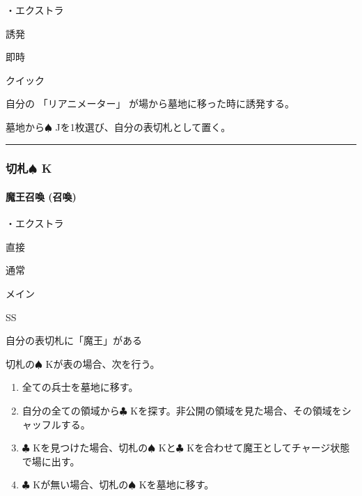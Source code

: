 \documentclass[letterpaper,10pt,dvipdfmx]{sphinxmanual}
\begin{document}
\sphinxAtStartPar
・エクストラ

\sphinxAtStartPar
{} 誘発

\sphinxAtStartPar
{} 即時

\sphinxAtStartPar
{} クイック

\sphinxAtStartPar
{}

\sphinxAtStartPar
自分の 「リアニメーター」 が場から墓地に移った時に誘発する。

\sphinxAtStartPar
{}

\sphinxAtStartPar
墓地から{\normalsize $\spadesuit$} Jを1枚選び、自分の表切札として置く。


\bigskip\hrule\bigskip



\subsubsection{切札{\normalsize $\spadesuit$} K}
\label{\detokenize{auto/frameActionlist:k}}

\paragraph{魔王召喚 (召喚)}
\label{\detokenize{auto/frameActionlist:act-summondarklord}}\label{\detokenize{auto/frameActionlist:id29}}
\sphinxAtStartPar
{}

\sphinxAtStartPar
・エクストラ

\sphinxAtStartPar
{} 直接

\sphinxAtStartPar
{} 通常

\sphinxAtStartPar
{} メイン

\sphinxAtStartPar
{} SS

\sphinxAtStartPar
{}

\sphinxAtStartPar
自分の表切札に「魔王」がある

\sphinxAtStartPar
{}

\sphinxAtStartPar
切札の{\normalsize $\spadesuit$} Kが表の場合、次を行う。
\begin{enumerate}
%
\item {} 
\sphinxAtStartPar
全ての兵士を墓地に移す。

\item {} 
\sphinxAtStartPar
自分の全ての領域から{\normalsize $\clubsuit$} Kを探す。非公開の領域を見た場合、その領域をシャッフルする。

\item {} 
\sphinxAtStartPar
{\normalsize $\clubsuit$} Kを見つけた場合、切札の{\normalsize $\spadesuit$} Kと{\normalsize $\clubsuit$} Kを合わせて魔王としてチャージ状態で場に出す。

\item {} 
\sphinxAtStartPar
{\normalsize $\clubsuit$} Kが無い場合、切札の{\normalsize $\spadesuit$} Kを墓地に移す。

\end{enumerate}
\end{document}
